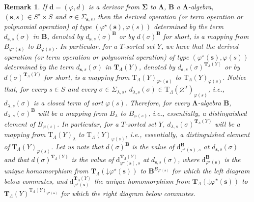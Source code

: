 \documentclass{amsart}
\newcommand{\vs}[1]{\mathbin{\downarrow}#1}
\theoremstyle{plain}
\newtheorem{remark}[theorem]{Remark}
\theoremstyle{definition}
\begin{document}
\begin{remark}
	If $\mathbf{d} = (\varphi,d)$ is a derivor from $\mathbf{\Sigma}$ to $\mathbf{\Lambda}$, $\mathbf{B}$ a 
	$\mathbf{\Lambda}$-algebra, $(\mathbf{s},s)\in S^{\star}\times S$ and $\sigma\in \Sigma_{\mathbf{s},s}$, then the derived operation (or term operation or polynomial operation) of type $(\varphi^{\star}(\mathbf{s}),\varphi(s))$ determined by the term $d_{\mathbf{s},s}(\sigma)$ in $\mathbf{B}$, denoted by $d_{\mathbf{s},s}(\sigma)^{\mathbf{B}}$ or by $d(\sigma)^{\mathbf{B}}$ for short, is a mapping from $B_{\varphi^{\star}(\mathbf{s})}$ to $B_{\varphi(s)}$. In particular, for a $T$-sorted set $Y$, we have that the derived operation (or term operation or polynomial operation) of type $(\varphi^{\star}(\mathbf{s}),\varphi(s))$ determined by the term $d_{\mathbf{s},s}(\sigma)$ in $\mathbf{T}_{\Lambda}(Y)$, denoted by $d_{\mathbf{s},s}(\sigma)^{\mathbf{T}_{\Lambda}(Y)}$ or by  $d(\sigma)^{\mathbf{T}_{\Lambda}(Y)}$ for short, is a mapping from $\mathrm{T}_{\Lambda}(Y)_{\varphi^{\star}(\mathbf{s})}$ to $\mathrm{T}_{\Lambda}(Y)_{\varphi(s)}$. Notice that, for every $s\in S$ and every $\sigma\in \Sigma_{\lambda,s}$, $d_{\lambda,s}(\sigma)\in \mathrm{T}_{\Lambda}(\varnothing^{T})_{\varphi(s)}$, i.e., $d_{\lambda,s}(\sigma)$ is a closed term of sort $\varphi(s)$.  Therefore, for every $\mathbf{\Lambda}$-algebra $\mathbf{B}$, $d_{\lambda,s}(\sigma)^{\mathbf{B}}$ will be a mapping from $B_{\lambda}$ to $B_{\varphi(s)}$, i.e., essentially, a distinguished element of $B_{\varphi(s)}$. In particular, for a $T$-sorted set $Y$, $d_{\lambda,s}(\sigma)^{\mathbf{T}_{\Lambda}(Y)}$ will be a mapping from $\mathrm{T}_{\Lambda}(Y)_{\lambda}$ to $\mathrm{T}_{\Lambda}(Y)_{\varphi(s)}$, i.e., essentially, a distinguished element of $\mathrm{T}_{\Lambda}(Y)_{\varphi(s)}$. Let us note that $d(\sigma)^{\mathbf{B}}$ is the value of $\mathrm{d}^{\mathbf{B}}_{\varphi^{\star}(\mathbf{s}),s}$ at $d_{\mathbf{s},s}(\sigma)$ and that $d(\sigma)^{\mathbf{T}_{\Lambda}(Y)}$ is the value of $\mathrm{d}^{\mathbf{T}_{\Lambda}(Y)}_{\varphi^{\star}(\mathbf{s}),s}$ at $d_{\mathbf{s},s}(\sigma)$, where 
	$\mathrm{d}^{\mathbf{B}}_{\varphi^{\star}(\mathbf{s})}$ is the unique homomorphism from $\mathbf{T}_{\Lambda}(\vs{\varphi^{\star}(\mathbf{s})})$ to $\mathbf{B}^{B_{\varphi^{\star}(\mathbf{s})}}$ for which the left diagram below commutes, and $\mathrm{d}^{\mathbf{T}_{\Lambda}(Y)}_{\varphi^{\star}(\mathbf{s})}$ the unique homomorphism from $\mathbf{T}_{\Lambda}(\vs{\varphi^{\star}(\mathbf{s})})$ to $\mathbf{T}_{\Lambda}(Y)^{\mathrm{T}_{\Lambda}(Y)_{\varphi^{\star}(\mathbf{s})}}$ for which the right diagram below commutes.

\end{remark}
\end{document}
